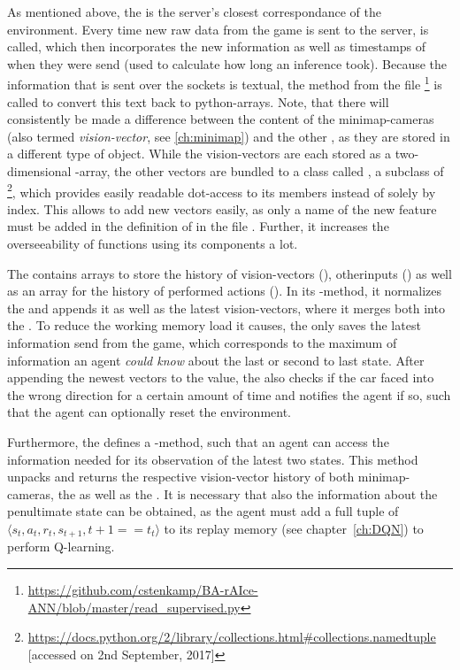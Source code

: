 As mentioned above, the  is the server's closest correspondance of the environment. Every time new raw data from the game is sent to the server,  is called, which then incorporates the new information as well as timestamps of when they were send (used to calculate how long an inference took). Because the information that is sent over the sockets is textual, the method  from the file \footnote{\label{fn:readsupervised}\url{https://github.com/cstenkamp/BA-rAIce-ANN/blob/master/read_supervised.py}} is called to convert this text back to python-arrays. Note, that there will consistently be made a difference between the content of the minimap-cameras (also termed \textit{vision-vector}, see \ref{ch:minimap}) and the other , as they are stored in a different type of object. While the vision-vectors are each stored as a two-dimensional -array, the other vectors are bundled to a class called , a subclass of  \footnote{\url{https://docs.python.org/2/library/collections.html#collections.namedtuple} [accessed on 2nd September, 2017]}, which provides easily readable dot-access to its members instead of solely by index. This allows to add new vectors easily, as only a name of the new feature must be added in the definition of  in the file . Further, it increases the overseeability of functions using its components a lot.

The  contains arrays to store the history of vision-vectors (), otherinputs () as well as an array for the history of performed actions (). In its -method, it normalizes the  and appends it as well as the latest vision-vectors, where it merges both into the .
To reduce the working memory load it causes, the  only saves the latest information send from the game, which corresponds to the maximum of information an agent \textit{could know} about the last or second to last state. After appending the newest vectors to the value, the  also checks if the car faced into the wrong direction for a certain amount of time and notifies the agent if so, such that the agent can optionally reset the environment.

Furthermore, the  defines a -method, such that an agent can access the information needed for its observation of the latest two states. This method unpacks and returns the respective vision-vector history of both minimap-cameras, the  as well as the . It is necessary that also the information about the penultimate state can be obtained, as the agent must add a full tuple of $\langle s_t, a_t, r_t, s_{t+1}, t+1==t_t \rangle$ to its replay memory (see chapter~\ref{ch:DQN}) to perform Q-learning. 

